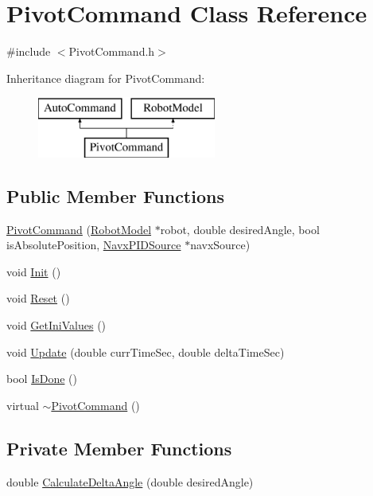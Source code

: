 \hypertarget{class_pivot_command}{}\section{Pivot\+Command Class Reference}
\label{class_pivot_command}


{\ttfamily \#include $<$Pivot\+Command.\+h$>$}

Inheritance diagram for Pivot\+Command\+:\begin{figure}[H]
\begin{center}
\leavevmode
\includegraphics[height=2.000000cm]{class_pivot_command}
\end{center}
\end{figure}
\subsection*{Public Member Functions}
\begin{DoxyCompactItemize}
\item 
\hyperlink{class_pivot_command_aeed6d5f91fade3124c4a66080edad50d}{Pivot\+Command} (\hyperlink{class_robot_model}{Robot\+Model} $\ast$robot, double desired\+Angle, bool is\+Absolute\+Position, \hyperlink{class_navx_p_i_d_source}{Navx\+P\+I\+D\+Source} $\ast$navx\+Source)
\item 
void \hyperlink{class_pivot_command_a4bc3497678e5fdc84e0ec545f87fcd2a}{Init} ()
\item 
void \hyperlink{class_pivot_command_a728a96471b607920a8e3581b15c2a6ed}{Reset} ()
\item 
void \hyperlink{class_pivot_command_add10aedba04f38b03753ac09fc1d4faf}{Get\+Ini\+Values} ()
\item 
void \hyperlink{class_pivot_command_ab43066cd70a708f342f53f94558acf98}{Update} (double curr\+Time\+Sec, double delta\+Time\+Sec)
\item 
bool \hyperlink{class_pivot_command_acc8ed3e6a76a19a05201131f0bd7ccc5}{Is\+Done} ()
\item 
virtual \hyperlink{class_pivot_command_a04deb767183afd763bec2ca5f3edc50d}{$\sim$\+Pivot\+Command} ()
\end{DoxyCompactItemize}
\subsection*{Private Member Functions}
\begin{DoxyCompactItemize}
\item 
double \hyperlink{class_pivot_command_a56f0c011b2a744f1ed0a2b5cb301cdb2}{Calculate\+Delta\+Angle} (double desired\+Angle)
\end{DoxyCompactItemize}
